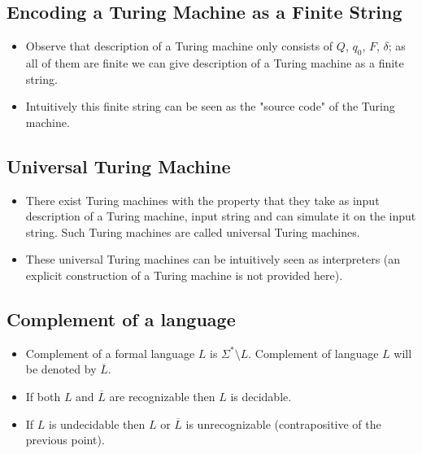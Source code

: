 \documentclass[
11pt,notheorems,hyperref={pdfauthor=whatever}
]{beamer}
\begin{document}
\subsection{Encoding a Turing Machine as a Finite String}
\begin{frame}
\begin{itemize}
    \item Observe that description of a Turing machine only consists of $Q$, $q_0$, $F$, $\delta$; as all of them are finite we can give description of a Turing machine as a finite string.
    \item Intuitively this finite string can be seen as the "source code" of the Turing machine.
\end{itemize}
\end{frame}

\subsection{Universal Turing Machine}
\begin{frame}
\begin{itemize}
    \item There exist Turing machines with the property that they take as input description of a Turing machine, input string and can simulate it on the input string. Such Turing machines are called universal Turing machines.
    \item These universal Turing machines can be intuitively seen as interpreters (an explicit construction of a Turing machine is not provided here).
\end{itemize}
\end{frame}

\subsection{Complement of a language}
\begin{frame}
\begin{itemize}
    \item Complement of a formal language $L$ is $\Sigma^* \setminus L$. Complement of language $L$ will be denoted by $\overline{L}$.
    \item If both $L$ and $\overline{L}$ are recognizable then $L$ is decidable.
    \item If $L$ is undecidable then $L$ or $\overline{L}$ is unrecognizable (contrapositive of the previous point).
\end{itemize}
\end{frame}
\end{document}
